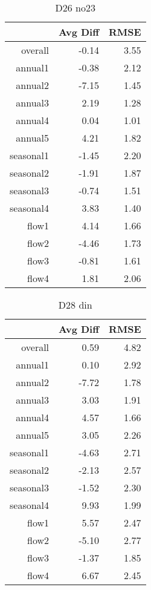 \begin{table}[H]
\centering
\begin{tabular}{rrr}
  \hline
 & Avg Diff & RMSE \\ 
  \hline
overall & -0.14 & 3.55 \\ 
  annual1 & -0.38 & 2.12 \\ 
  annual2 & -7.15 & 1.45 \\ 
  annual3 & 2.19 & 1.28 \\ 
  annual4 & 0.04 & 1.01 \\ 
  annual5 & 4.21 & 1.82 \\ 
  seasonal1 & -1.45 & 2.20 \\ 
  seasonal2 & -1.91 & 1.87 \\ 
  seasonal3 & -0.74 & 1.51 \\ 
  seasonal4 & 3.83 & 1.40 \\ 
  flow1 & 4.14 & 1.66 \\ 
  flow2 & -4.46 & 1.73 \\ 
  flow3 & -0.81 & 1.61 \\ 
  flow4 & 1.81 & 2.06 \\ 
   \hline
\end{tabular}
\caption{D26 no23} 
\end{table}
\begin{table}[H]
\centering
\begin{tabular}{rrr}
  \hline
 & Avg Diff & RMSE \\ 
  \hline
overall & 0.59 & 4.82 \\ 
  annual1 & 0.10 & 2.92 \\ 
  annual2 & -7.72 & 1.78 \\ 
  annual3 & 3.03 & 1.91 \\ 
  annual4 & 4.57 & 1.66 \\ 
  annual5 & 3.05 & 2.26 \\ 
  seasonal1 & -4.63 & 2.71 \\ 
  seasonal2 & -2.13 & 2.57 \\ 
  seasonal3 & -1.52 & 2.30 \\ 
  seasonal4 & 9.93 & 1.99 \\ 
  flow1 & 5.57 & 2.47 \\ 
  flow2 & -5.10 & 2.77 \\ 
  flow3 & -1.37 & 1.85 \\ 
  flow4 & 6.67 & 2.45 \\ 
   \hline
\end{tabular}
\caption{D28 din} 
\end{table}
